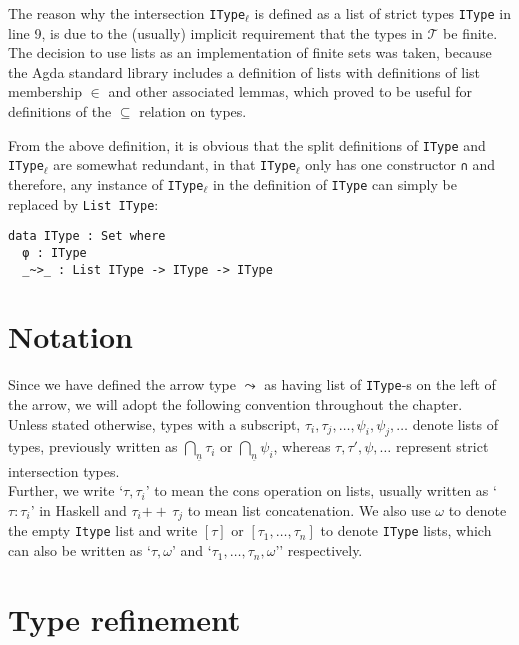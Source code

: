 \documentclass[a4paper, 12pt, twoside]{style/ociamthesis}
\theoremstyle{plain}
\theoremstyle{definition}
\theoremstyle{remark}
\newcommand{\concat}{\ensuremath{+\!\!\!\!+\,}}
\newcommand{\taui}{\bigcap\nolimits_{\underline{n}} \tau_i}
\begin{document}
The reason why the intersection \texttt{IType}\(_\ell\) is defined as a
list of strict types \texttt{IType} in line 9, is due to the (usually)
implicit requirement that the types in \(\mathcal{T}\) be finite. The
decision to use lists as an implementation of finite sets was taken,
because the Agda standard library includes a definition of lists with
definitions of list membership \(\in\) and other associated lemmas,
which proved to be useful for definitions of the \(\subseteq\) relation
on types.

From the above definition, it is obvious that the split definitions of
\texttt{IType} and \texttt{IType}\(_\ell\) are somewhat redundant, in
that \texttt{IType}\(_\ell\) only has one constructor \texttt{∩} and
therefore, any instance of \texttt{IType}\(_\ell\) in the definition of
\texttt{IType} can simply be replaced by \texttt{List IType}:

\begin{verbatim}
data IType : Set where
  φ : IType
  _~>_ : List IType -> IType -> IType
\end{verbatim}

\section{Notation}\label{notation}

\label{notation}

Since we have defined the arrow type \(\leadsto\) as having list of
\texttt{IType}-s on the left of the arrow, we will adopt the following
convention throughout the chapter.\\
Unless stated otherwise, types with a subscript,
\(\tau_i, \tau_j, \hdots, \psi_i, \psi_j, \hdots\) denote lists of
types, previously written as \(\taui\) or
\(\bigcap\nolimits_{\underline{n}} \psi_i\), whereas
\(\tau, \tau', \psi, \hdots\) represent strict intersection types.\\
Further, we write `\(\tau, \tau_i\)' to mean the cons operation on
lists, usually written as `\(\tau : \tau_i\)' in Haskell and
\(\tau_i \concat \tau_j\) to mean list concatenation. We also use
\(\omega\) to denote the empty \texttt{Itype} list and write \([\tau]\)
or \([\tau_1, \hdots, \tau_n]\) to denote \texttt{IType} lists, which
can also be written as `\(\tau, \omega\)' and
`\(\tau_1, \hdots, \tau_n, \omega\)'' respectively.

\section{Type refinement}\label{type-refinement-1}
\end{document}
